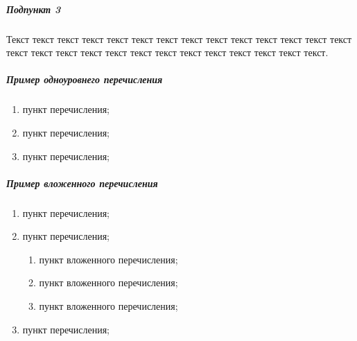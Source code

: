 \subparagraph{Подпункт 3} 
Текст текст текст текст текст текст текст текст текст текст текст текст текст текст текст текст текст текст текст текст текст текст текст текст текст текст текст.

\subparagraph{Пример одноуровнего перечисления} 

\begin{enumerate}
\item пункт перечисления;
\item пункт перечисления;
\item пункт перечисления;
\end{enumerate}

\subparagraph{Пример вложенного перечисления} 

%
\begin{enumerate}
\item пункт перечисления;
\item пункт перечисления;	
\begin{enumerate}%
	\item пункт вложенного перечисления;
	\item пункт вложенного перечисления;
	\item пункт вложенного перечисления;
\end{enumerate}	
\item пункт перечисления;
\end{enumerate}







